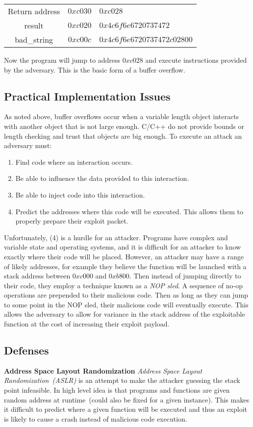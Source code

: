 \documentclass{article}
\begin{document}
\begin{tabular}{c|c|l}
Return address & $0xc030$ & $0xc028$\\
result & $0xc020$ & $0x4c6f6e6720737472$\\
bad\_string & $0xc00c$ & $0x4c6f6e6720737472c02800$\\
\end{tabular}

Now the program will jump to address $0xc028$ and execute instructions provided by the adversary.  This is the basic form of a buffer overflow.

\subsection{Practical Implementation Issues}
As noted above, buffer overflows occur when a variable length object interacts with another object that is not large enough.  C/C++ do not provide bounds or length checking and trust that objects are big enough.  To execute an attack an adversary must:

\begin{enumerate}
\item Find code where an interaction occurs.
\item Be able to influence the data provided to this interaction.
\item Be able to inject code into this interaction.
\item Predict the addresses where this code will be executed.  This allows them to properly prepare their exploit packet.
\end{enumerate}

Unfortunately, (4) is a hurdle for an attacker.  Programs have complex and variable state and operating systems, and it is difficult for an attacker to know exactly where their code will be placed.  However, an attacker may have a range of likely addresses, for example they believe the function will be launched with a stack address between $0xc000$ and $0xb800$.  Then instead of jumping directly to their code, they employ a technique known as a \emph{NOP sled}.  A sequence of no-op operations are prepended to their malicious code.  Then as long as they can jump to some point in the NOP sled, their malicious code will eventually execute.  This allows the adversary to allow for variance in the stack address of the exploitable function at the cost of increasing their exploit payload.

\subsection{Defenses}
\textbf{Address Space Layout Randomization}
\emph{Address Space Layout Randomization~(ASLR)} is an attempt to make the attacker guessing the stack point infeasible.  In high level idea is that programs and functions are given random address at runtime~(could also be fixed for a given instance).  This makes it difficult to predict where a given function will be executed and thus an exploit is likely to cause a crash instead of malicious code execution.
\end{document}

